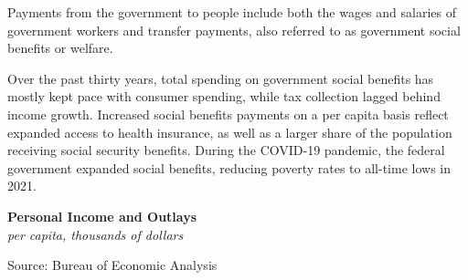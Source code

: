 \documentclass{report}
\makeatletter
\newcommand{\tbllink}[1]{\href{https://raw.githubusercontent.com/bdecon/US-chartbook/master/chartbook/data/#1}{\faTable}}
\newcommand*\short[1]{\expandafter\@gobbletwo\number\numexpr#1\relax}
\newcommand{\stdnode}[3]{\node[below, align=left, shift=({#1,#2})]{#3};}
\newcommand{\absnode}[3]{\node[below right, align=left] at (axis cs: #1,#2) {#3};}
\newcommand{\shdateaxisticks}{
		date coordinates in=x, axis line style={draw=none},
		xmax={2024-07-31},
		max space between ticks=40,	    
		xtick={{1990-01-01}, {1995-01-01}, {2000-01-01}, 
			{2005-01-01}, {2010-01-01}, {2015-01-01}, {2020-01-01}},
		minor xtick={},
		enlarge y limits={0.06}, enlarge x limits={0.01},
		xticklabel style={align=center, yshift=-2pt}, tick label style={inner sep=0pt},
		}
\newcommand{\bbar}[2]{extra #1 ticks = {{#2}}, extra #1 tick labels = ,
		extra #1 tick style = {grid=major, grid style={thick, black!25}},}
\newcommand{\stdline}[4]{\addplot[very thick, no markers, color=#1] 
		table [x=#2, y=#3, col sep=comma] {#4};	}
\newcommand{\rbars}{
		\fill[color=black!10] (axis cs:{1990-07-01},\pgfkeysvalueof{/pgfplots/ymin})
			rectangle (axis cs:{1991-03-01}, \pgfkeysvalueof{/pgfplots/ymax});
		\fill[color=black!10] (axis cs:{2007-12-01},\pgfkeysvalueof{/pgfplots/ymin})
			rectangle (axis cs:{2009-07-01}, \pgfkeysvalueof{/pgfplots/ymax});
		\fill[color=black!10] (axis cs:{2001-03-01},\pgfkeysvalueof{/pgfplots/ymin})
			rectangle (axis cs:{2001-11-01}, \pgfkeysvalueof{/pgfplots/ymax});
		\fill[color=black!10] (axis cs:{2020-02-01},\pgfkeysvalueof{/pgfplots/ymin})
			rectangle (axis cs:{2020-05-01}, \pgfkeysvalueof{/pgfplots/ymax});}
\makeatother
\begin{document}
{\begin{minipage}{0.76\textwidth}
\small Payments from the government to people include both the wages and salaries of government workers and transfer payments, also referred to as government social benefits or welfare.

Over the past thirty years, total spending on government social benefits has mostly kept pace with consumer spending, while tax collection lagged behind income growth. Increased social benefits payments on a per capita basis reflect expanded access to health insurance, as well as a larger share of the population receiving social security benefits. During the COVID-19 pandemic, the federal government expanded social benefits, reducing poverty rates to all-time lows in 2021. 
\end{minipage}
\vspace{1mm}

\begin{minipage}{0.38\textwidth}
\normalsize \textbf{Personal Income and Outlays}\\
\footnotesize{\textit{per capita, thousands of dollars}}
\vspace{3.5cm}

\hspace{2mm} 

\footnotesize{Source: Bureau of Economic Analysis} \hfill \tbllink{govpi.csv}
\end{minipage}\hspace{5mm}
\begin{minipage}{0.34\textwidth}
\small 
\end{minipage}
\vspace{3mm}

}
\end{document}
